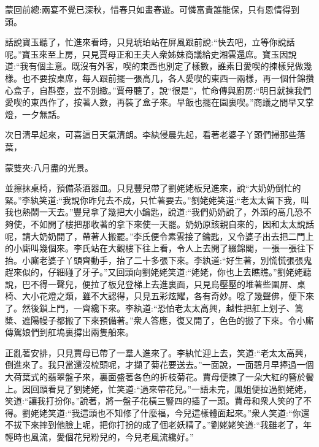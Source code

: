 

\begin{parag}
    \begin{note}蒙回前總:兩宴不覺已深秋，惜春只如畫春遊。可憐富貴誰能保，只有恩情得到頭。\end{note}
\end{parag}


\begin{parag}
    話說寶玉聽了，忙進來看時，只見琥珀站在屏風跟前說:“快去吧，立等你說話呢。”寶玉來至上房，只見賈母正和王夫人衆姊妹商議給史湘雲還席。寶玉因說道:“我有個主意。既沒有外客，喫的東西也別定了樣數，誰素日愛喫的揀樣兒做幾樣。也不要按桌席，每人跟前擺一張高几，各人愛喫的東西一兩樣，再一個什錦攢心盒子，自斟壺，豈不別緻。”賈母聽了，說“很是”，忙命傳與廚房:“明日就揀我們愛喫的東西作了，按著人數，再裝了盒子來。早飯也擺在園裏喫。”商議之間早又掌燈，一夕無話。
\end{parag}


\begin{parag}
    次日清早起來，可喜這日天氣清朗。李紈侵晨先起，看著老婆子丫頭們掃那些落葉，\begin{note}蒙雙夾:八月盡的光景。\end{note}並擦抹桌椅，預備茶酒器皿。只見豐兒帶了劉姥姥板兒進來，說“大奶奶倒忙的緊。”李紈笑道:“我說你昨兒去不成，只忙著要去。”劉姥姥笑道:“老太太留下我，叫我也熱鬧一天去。”豐兒拿了幾把大小鑰匙，說道:“我們奶奶說了，外頭的高几恐不夠使，不如開了樓把那收著的拿下來使一天罷。奶奶原該親自來的，因和太太說話呢，請大奶奶開了，帶著人搬罷。”李氏便令素雲接了鑰匙，又令婆子出去把二門上的小廝叫幾個來。李氏站在大觀樓下往上看，令人上去開了綴錦閣，一張一張往下抬。小廝老婆子丫頭齊動手，抬了二十多張下來。李紈道:“好生著，別慌慌張張鬼趕來似的，仔細碰了牙子。”又回頭向劉姥姥笑道:“姥姥，你也上去瞧瞧。”劉姥姥聽說，巴不得一聲兒，便拉了板兒登梯上去進裏面，只見烏壓壓的堆著些圍屏、桌椅、大小花燈之類，雖不大認得，只見五彩炫耀，各有奇妙。唸了幾聲佛，便下來了。然後鎖上門，一齊纔下來。李紈道:“恐怕老太太高興，越性把舡上划子、篙槳、遮陽幔子都搬了下來預備著。”衆人答應，復又開了，色色的搬了下來。令小廝傳駕娘們到舡塢裏撐出兩隻船來。
\end{parag}


\begin{parag}
    正亂著安排，只見賈母已帶了一羣人進來了。李紈忙迎上去，笑道:“老太太高興，倒進來了。我只當還沒梳頭呢，才擷了菊花要送去。”一面說，一面碧月早捧過一個大荷葉式的翡翠盤子來，裏面盛著各色的折枝菊花。賈母便揀了一朵大紅的簪於鬢上。因回頭看見了劉姥姥，忙笑道:“過來帶花兒。”一語未完，鳳姐便拉過劉姥姥，笑道:“讓我打扮你。”說著，將一盤子花橫三豎四的插了一頭。賈母和衆人笑的了不得。劉姥姥笑道:“我這頭也不知修了什麼福，今兒這樣體面起來。”衆人笑道:“你還不拔下來摔到他臉上呢，把你打扮的成了個老妖精了。”劉姥姥笑道:“我雖老了，年輕時也風流，愛個花兒粉兒的，今兒老風流纔好。”
\end{parag}


